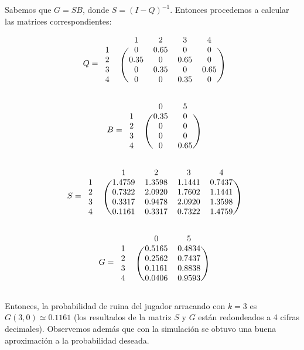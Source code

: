 \documentclass[11pt]{article}
\begin{document}
Sabemos que $ G = SB $, donde $ S = (I - Q)^{-1} $. Entonces procedemos a 
calcular las matrices correspondientes:

\begin{equation*}
  Q = 
  \begin{blockarray}{cccccc}
     & & 1 & 2 & 3 & 4 \\
    \begin{block}{cc(cccc)}
      1 & & 0    & 0.65 & 0    & 0    \\
      2 & & 0.35 & 0    & 0.65 & 0    \\
      3 & & 0    & 0.35 & 0    & 0.65 \\
      4 & & 0    & 0    & 0.35 & 0    \\
    \end{block}
  \end{blockarray}
\end{equation*}

\begin{equation*}
  B = 
  \begin{blockarray}{cccc}
     & & 0 & 5 \\
    \begin{block}{cc(cc)}
      1 & & 0.35 & 0   \\
      2 & & 0    & 0   \\
      3 & & 0    & 0   \\
      4 & & 0    & 0.65 \\
    \end{block}
  \end{blockarray}
\end{equation*}

\begin{equation*}
  S = 
  \begin{blockarray}{cccccc}
     & & 1 & 2 & 3 & 4 \\
    \begin{block}{cc(cccc)}
      1 & & 1.4759 & 1.3598 & 1.1441 & 0.7437 \\
      2 & & 0.7322 & 2.0920 & 1.7602 & 1.1441 \\
      3 & & 0.3317 & 0.9478 & 2.0920 & 1.3598 \\
      4 & & 0.1161 & 0.3317 & 0.7322 & 1.4759 \\
    \end{block}
  \end{blockarray}
\end{equation*}

\begin{equation*}
  G = 
  \begin{blockarray}{cccc}
     & & 0 & 5 \\
    \begin{block}{cc(cc)}
      1 & & 0.5165 & 0.4834 \\
      2 & & 0.2562 & 0.7437 \\
      3 & & 0.1161 & 0.8838 \\
      4 & & 0.0406 & 0.9593 \\
    \end{block}
  \end{blockarray}
\end{equation*}

Entonces, la probabilidad de ruina del jugador arracando con $ k = 3 $ es $ G(3, 0) \simeq 0.1161 $ (los resultados de la 
matriz $S$ y $G$ están redondeados a 4 cifras decimales). Observemos además que con la simulación
se obtuvo una buena aproximación a la probabilidad deseada.
\end{document}
